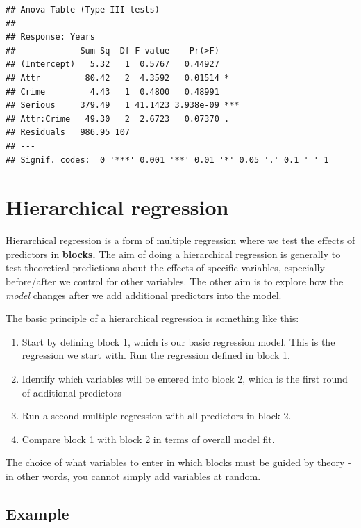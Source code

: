 \documentclass[
]{book}
\providecommand{\tightlist}{%
  \setlength{\itemsep}{0pt}\setlength{\parskip}{0pt}}
\begin{document}
\begin{verbatim}
## Anova Table (Type III tests)
## 
## Response: Years
##             Sum Sq  Df F value    Pr(>F)    
## (Intercept)   5.32   1  0.5767   0.44927    
## Attr         80.42   2  4.3592   0.01514 *  
## Crime         4.43   1  0.4800   0.48991    
## Serious     379.49   1 41.1423 3.938e-09 ***
## Attr:Crime   49.30   2  2.6723   0.07370 .  
## Residuals   986.95 107                      
## ---
## Signif. codes:  0 '***' 0.001 '**' 0.01 '*' 0.05 '.' 0.1 ' ' 1
\end{verbatim}

\section{Hierarchical regression}\label{hierarchical-regression}

Hierarchical regression is a form of multiple regression where we test the effects of predictors in \textbf{blocks.} The aim of doing a hierarchical regression is generally to test theoretical predictions about the effects of specific variables, especially before/after we control for other variables. The other aim is to explore how the \emph{model} changes after we add additional predictors into the model.

The basic principle of a hierarchical regression is something like this:

\begin{enumerate}
\def\labelenumi{\arabic{enumi}.}
\tightlist
\item
  Start by defining block 1, which is our basic regression model. This is the regression we start with. Run the regression defined in block 1.
\item
  Identify which variables will be entered into block 2, which is the first round of additional predictors
\item
  Run a second multiple regression with all predictors in block 2.
\item
  Compare block 1 with block 2 in terms of overall model fit.
\end{enumerate}

The choice of what variables to enter in which blocks must be guided by theory - in other words, you cannot simply add variables at random.

\subsection{Example}\label{example-7}
\end{document}
